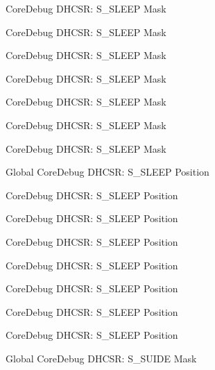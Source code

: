 \begin{DoxyRefList}
\label{deprecated__deprecated000116}%
%
Core\+Debug DHCSR\+: S\+\_\+\+SLEEP Mask 

\label{deprecated__deprecated000024}%
%
Core\+Debug DHCSR\+: S\+\_\+\+SLEEP Mask 

\label{deprecated__deprecated000170}%
%
Core\+Debug DHCSR\+: S\+\_\+\+SLEEP Mask 

\label{deprecated__deprecated000388}%
%
Core\+Debug DHCSR\+: S\+\_\+\+SLEEP Mask 

\label{deprecated__deprecated000255}%
%
Core\+Debug DHCSR\+: S\+\_\+\+SLEEP Mask 

\label{deprecated__deprecated000312}%
%
Core\+Debug DHCSR\+: S\+\_\+\+SLEEP Mask 

\label{deprecated__deprecated000577}%
%
Core\+Debug DHCSR\+: S\+\_\+\+SLEEP Mask  
\item[Global \doxylink{group___c_m_s_i_s___core_debug_ga349ccea33accc705595624c2d334fbcb}{Core\+Debug\+\_\+\+DHCSR\+\_\+\+S\+\_\+\+SLEEP\+\_\+\+Pos} ]\label{deprecated__deprecated000169}%
%
Core\+Debug DHCSR\+: S\+\_\+\+SLEEP Position 

\label{deprecated__deprecated000023}%
%
Core\+Debug DHCSR\+: S\+\_\+\+SLEEP Position 

\label{deprecated__deprecated000387}%
%
Core\+Debug DHCSR\+: S\+\_\+\+SLEEP Position 

\label{deprecated__deprecated000474}%
%
Core\+Debug DHCSR\+: S\+\_\+\+SLEEP Position 

\label{deprecated__deprecated000311}%
%
Core\+Debug DHCSR\+: S\+\_\+\+SLEEP Position 

\label{deprecated__deprecated000576}%
%
Core\+Debug DHCSR\+: S\+\_\+\+SLEEP Position 

\label{deprecated__deprecated000115}%
%
Core\+Debug DHCSR\+: S\+\_\+\+SLEEP Position 

\label{deprecated__deprecated000254}%
%
Core\+Debug DHCSR\+: S\+\_\+\+SLEEP Position  
\item[Global \doxylink{group___c_m_s_i_s___s_c_b_gad37656791dbb216ffb194995f28c412c}{Core\+Debug\+\_\+\+DHCSR\+\_\+\+S\+\_\+\+SUIDE\+\_\+\+Msk} ]\label{deprecated__deprecated000016}%
%
Core\+Debug DHCSR\+: S\+\_\+\+SUIDE Mask 


\end{DoxyRefList}
